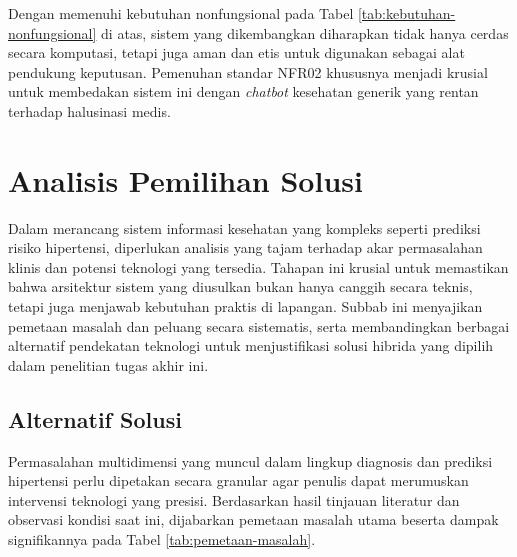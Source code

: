 Dengan memenuhi kebutuhan nonfungsional pada Tabel \ref{tab:kebutuhan-nonfungsional} di atas, sistem yang dikembangkan diharapkan tidak hanya cerdas secara komputasi, tetapi juga aman dan etis untuk digunakan sebagai alat pendukung keputusan. Pemenuhan standar NFR02 khususnya menjadi krusial untuk membedakan sistem ini dengan \textit{chatbot} kesehatan generik yang rentan terhadap halusinasi medis.

\section{Analisis Pemilihan Solusi}
Dalam merancang sistem informasi kesehatan yang kompleks seperti prediksi risiko hipertensi, diperlukan analisis yang tajam terhadap akar permasalahan klinis dan potensi teknologi yang tersedia. Tahapan ini krusial untuk memastikan bahwa arsitektur sistem yang diusulkan bukan hanya canggih secara teknis, tetapi juga menjawab kebutuhan praktis di lapangan. Subbab ini menyajikan pemetaan masalah dan peluang secara sistematis, serta membandingkan berbagai alternatif pendekatan teknologi untuk menjustifikasi solusi hibrida yang dipilih dalam penelitian tugas akhir ini.

\subsection{Alternatif Solusi}
Permasalahan multidimensi yang muncul dalam lingkup diagnosis dan prediksi hipertensi perlu dipetakan secara granular agar penulis dapat merumuskan intervensi teknologi yang presisi. Berdasarkan hasil tinjauan literatur dan observasi kondisi saat ini, dijabarkan pemetaan masalah utama beserta dampak signifikannya pada Tabel \ref{tab:pemetaan-masalah}.

